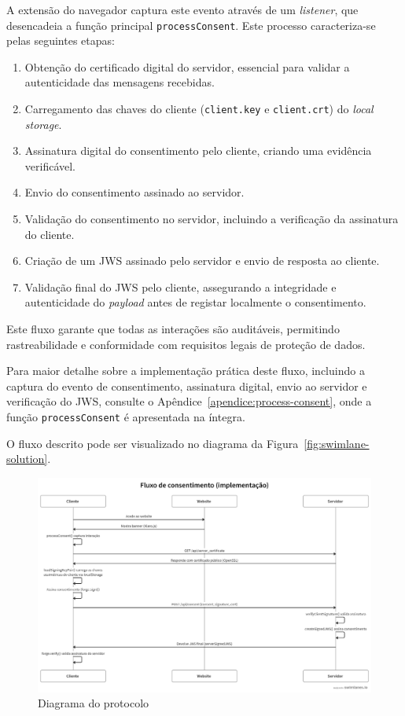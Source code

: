 A extensão do navegador captura este evento através de um \textit{listener}, que desencadeia a função principal \texttt{processConsent}. Este processo caracteriza-se pelas seguintes etapas:
\begin{enumerate}
    \item Obtenção do certificado digital do servidor, essencial para validar a autenticidade das mensagens recebidas.
    \item Carregamento das chaves do cliente (\texttt{client.key} e \texttt{client.crt}) do \textit{local storage}.
    \item Assinatura digital do consentimento pelo cliente, criando uma evidência verificável.
    \item Envio do consentimento assinado ao servidor.
    \item Validação do consentimento no servidor, incluindo a verificação da assinatura do cliente.
    \item Criação de um JWS assinado pelo servidor e envio de resposta ao cliente.
    \item Validação final do JWS pelo cliente, assegurando a integridade e autenticidade do \textit{payload} antes de registar localmente o consentimento.
\end{enumerate}

Este fluxo garante que todas as interações são auditáveis, permitindo rastreabilidade e conformidade com requisitos legais de proteção de dados.

Para maior detalhe sobre a implementação prática deste fluxo, incluindo a captura do evento de consentimento, assinatura digital, envio ao servidor e verificação do JWS, consulte o Apêndice~\ref{apendice:process-consent}, onde a função \texttt{processConsent} é apresentada na íntegra.

O fluxo descrito pode ser visualizado no diagrama da Figura~\ref{fig:swimlane-solution}.

\label{fig:swimlane-solution}
\begin{figure}[h]
\begin{center}
\includegraphics[width=1\textwidth]{images/swimlanes_solution.png}
\end{center}
\caption{Diagrama do protocolo}
\end{figure}

